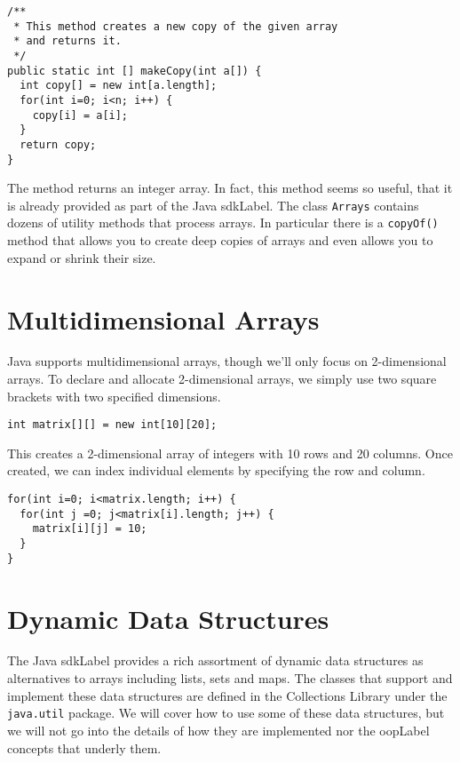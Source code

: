 \begin{verbatim}
/**
 * This method creates a new copy of the given array
 * and returns it.
 */
public static int [] makeCopy(int a[]) {
  int copy[] = new int[a.length];
  for(int i=0; i<n; i++) {
    copy[i] = a[i];
  }
  return copy;
}
\end{verbatim}

The method returns an integer array.  In fact, this method seems
so useful, that it is already provided as part of the Java \gls{sdkLabel}.
The class \texttt{Arrays} contains dozens of utility
methods that process arrays.  In particular there is a \texttt{copyOf()}
method that allows you to create deep copies of arrays and
even allows you to expand or shrink their size.

\section{Multidimensional Arrays}

Java supports multidimensional arrays, though we'll only focus 
on 2-dimensional arrays.  To declare and allocate 2-dimensional
arrays, we simply use two square brackets with two specified
dimensions.

\begin{verbatim}
int matrix[][] = new int[10][20];
\end{verbatim}

This creates a 2-dimensional array of integers with 10 rows and
20 columns.  Once created, we can index individual elements by
specifying the row and column.

\begin{verbatim}
for(int i=0; i<matrix.length; i++) {
  for(int j =0; j<matrix[i].length; j++) {
    matrix[i][j] = 10;
  }
}
\end{verbatim}

\section{Dynamic Data Structures}

The Java \gls{sdkLabel} provides a rich assortment of dynamic
data structures as alternatives to arrays including lists, sets and
maps.  The classes that support and implement these data 
structures are defined in the Collections Library under the 
\texttt{java.util} package.  We will cover how to use
some of these data structures, but we will not go into the
details of how they are implemented nor the \gls{oopLabel}
concepts that underly them.

